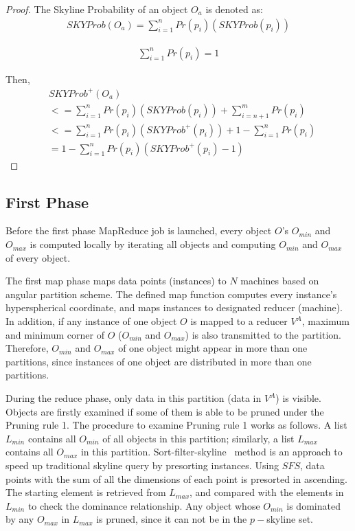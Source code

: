 \begin{proof}
The Skyline Probability of an object $O_a$ is denoted as:
\begin{equation}
    \begin{aligned}
SKYProb(O_a) = \sum\limits_{i=1}^n Pr(p_i)(SKYProb(p_i))
    \end{aligned}
\end{equation}

\begin{equation}
    \begin{aligned}
\sum\limits_{i=1}^n Pr(p_i) = 1
    \end{aligned}
\end{equation}

Then, 
\begin{equation}
    \begin{aligned}
& SKYProb^{+}(O_a) \\
& <= \sum\limits_{i=1}^n Pr(p_i)(SKYProb(p_i)) +
\sum\limits_{i=n+1}^m Pr(p_i) \\
& <= \sum\limits_{i=1}^n Pr(p_i)(SKYProb^+(p_i)) +
1 - \sum\limits_{i=1}^n Pr(p_i) \\
& = 1 - \sum\limits_{i=1}^n Pr(p_i)(SKYProb^+(p_i)-1)
    \end{aligned}
\end{equation}
\end{proof}


\subsection{First Phase}
\label{firstPhase}
Before the first phase MapReduce job is launched, every object $O$'s $O_{min}$ and $O_{max}$ is computed locally by iterating all objects and computing $O_{min}$ and $O_{max}$ of every object.

The first map phase maps data points (instances) to $N$ machines based on angular partition scheme. The defined map function computes every instance's hyperspherical coordinate, and maps instances to designated reducer (machine). In addition, if any instance of one object $O$ is mapped to a reducer $V^A$, maximum and minimum corner of $O$ ($O_{min}$ and $O_{max}$) is also transmitted to the partition. Therefore, $O_{min}$ and $O_{max}$ of one object might appear in more than one partitions, since instances of one object are distributed in more than one partitions.

During the reduce phase, only data in this partition (data in $V^A$) is visible. Objects are firstly examined if some of them is able to be pruned under the Pruning rule 1. The procedure to examine Pruning rule 1 works as follows. A list $L_{min}$ contains all $O_{min}$ of all objects in this partition; similarly, a list $L_{max}$ contains all $O_{max}$ in this partition. Sort-filter-skyline~\cite{icde/ChomickiGGL03} method is an approach to speed up traditional skyline query by presorting instances. Using $SFS$, data points with the sum of all the dimensions of each point is presorted in ascending. The starting element is retrieved from $L_{max}$, and compared with the elements in $L_{min}$ to check the dominance relationship. Any object whose $O_{min}$ is dominated by any $O_{max}$ in $L_{max}$ is pruned, since it can not be in the $p-$skyline set.

